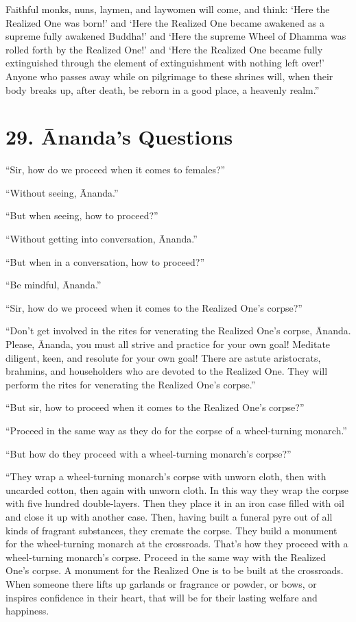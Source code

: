 \documentclass[12pt,openany]{book}%
\begin{document}
Faithful monks, nuns, laymen, and laywomen will come, and think: ‘Here the Realized One was born!’ and ‘Here the Realized One became awakened as a supreme fully awakened Buddha!’ and ‘Here the supreme Wheel of Dhamma was rolled forth by the Realized One!’ and ‘Here the Realized One became fully extinguished through the element of extinguishment with nothing left over!’ Anyone who passes away while on pilgrimage to these shrines will, when their body breaks up, after death, be reborn in a good place, a heavenly realm.” 

\section*{29. Ānanda’s Questions }

“Sir, how do we proceed when it comes to females?” 

“Without seeing, Ānanda.” 

“But when seeing, how to proceed?” 

“Without getting into conversation, Ānanda.” 

“But when in a conversation, how to proceed?” 

“Be mindful, Ānanda.” 

“Sir, how do we proceed when it comes to the Realized One’s corpse?” 

“Don’t get involved in the rites for venerating the Realized One’s corpse, Ānanda. Please, Ānanda, you must all strive and practice for your own goal! Meditate diligent, keen, and resolute for your own goal! There are astute aristocrats, brahmins, and householders who are devoted to the Realized One. They will perform the rites for venerating the Realized One’s corpse.” 

“But sir, how to proceed when it comes to the Realized One’s corpse?” 

“Proceed in the same way as they do for the corpse of a wheel-turning monarch.” 

“But how do they proceed with a wheel-turning monarch’s corpse?” 

“They wrap a wheel-turning monarch’s corpse with unworn cloth, then with uncarded cotton, then again with unworn cloth. In this way they wrap the corpse with five hundred double-layers. Then they place it in an iron case filled with oil and close it up with another case. Then, having built a funeral pyre out of all kinds of fragrant substances, they cremate the corpse. They build a monument for the wheel-turning monarch at the crossroads. That’s how they proceed with a wheel-turning monarch’s corpse. Proceed in the same way with the Realized One’s corpse. A monument for the Realized One is to be built at the crossroads. When someone there lifts up garlands or fragrance or powder, or bows, or inspires confidence in their heart, that will be for their lasting welfare and happiness. 
\end{document}
